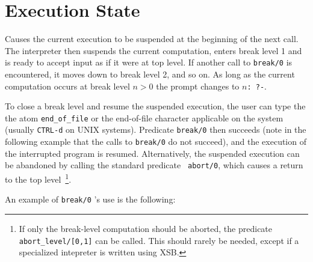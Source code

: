 

\section{Execution State}\label{environmental}

\begin{description}

%
Causes the current execution to be suspended at the beginning of the
next call.  The interpreter then suspends the current computation,
enters break level 1 and is ready to accept input as if it were at top
level.  If another call to {\tt break/0} is encountered, it moves down
to break level 2, and so on.  As long as the current computation
occurs at break level $n>0$ the prompt changes to {\tt $n$: ?-}.  

To close a break level and resume the suspended execution, the user
can type the the atom {\tt end\_of\_file} or the end-of-file character
applicable on the system (usually {\tt CTRL-d} on UNIX systems).
Predicate {\tt break/0} then succeeds (note in the following example
that the calls to {\tt break/0} do not succeed), and the execution of
the interrupted program is resumed.  Alternatively, the suspended
execution can be abandoned by calling the standard predicate {\tt
  abort/0}, which causes a return to the top level~\footnote{If only
  the break-level computation should be aborted, the predicate {\tt
    abort\_level/[0,1]} can be called.  This should rarely be needed,
  except if a specialized intepreter is written using XSB.}.

    An example of {\tt break/0} 's use is the following:



\end{description}
